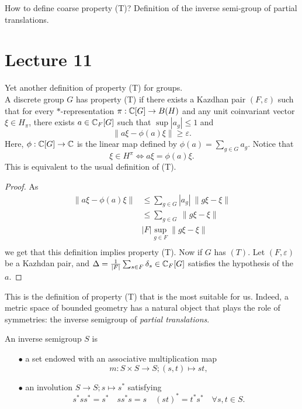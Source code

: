 How to define coarse property (T)? Definition of the inverse semi-group of partial translations.

\section{Lecture 11}

Yet another definition of property (T) for groups.\\

A discrete group $G$ has property (T) if there exists a Kazdhan pair $(F, \varepsilon)$ such that for every $*$-representation $\pi : \mathbb C [G] \rightarrow B(H)$ and any unit coinvariant vector $\xi \in H_\pi$, there exists $a\in \mathbb C_F[G]$ such that $\sup |a_g|\leq 1$ and 
\[\|a\xi -\phi(a) \xi\|\geq \varepsilon . \]   
Here, $\phi: \mathbb C[G]\rightarrow \mathbb C$ is the linear map defined by $\phi(a)= \sum_{g\in G}a_g$. Notice that 
\[\xi \in H^\pi \iff a\xi = \phi(a)\xi . \]
This is equivalent to the usual definition of (T).

\begin{proof} 
As 
\[\begin{split}
\|a\xi - \phi(a)\xi\| & \leq \sum_{g \in G} |a_g| \ \|g\xi -\xi \| \\
		& \leq \sum_{g \in G} \ \|g\xi -\xi \| \\
		& |F|\sup_{g\in F} \|g\xi -\xi \| \\
\end{split}\]
we get that this definition implies property (T).
Now if $G$ has $(T)$. Let $(F,\varepsilon)$ be a Kazhdan pair, and $\Delta = \frac{1}{|F|}\sum_{s\in F}\delta_s\in \mathbb C_{F}[G]$ satisfies the hypothesis of the $a$.
\end{proof} 


This is the definition of property (T) that is the most suitable for us. Indeed, a metric space of bounded geometry has a natural object that plays the role of symmetries: the inverse semigroup of \textit{partial translations}.

\begin{definition}
An inverse semigroup $S$ is
\begin{itemize}
\item[$\bullet$] a set endowed with an associative multiplication map 
\[m: S\times S \rightarrow S; (s,t )\mapsto st,\]
\item[$\bullet$] an involution $S\rightarrow S ; s\mapsto s^*$ satisfying
\[s^*ss^* = s^* \quad ss^*s = s  \quad (st)^* =t^* s^*\quad \forall s,t \in S.\]
\end{itemize}
\end{definition}

